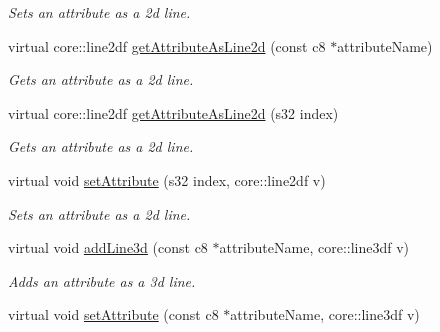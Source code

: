 \begin{DoxyCompactItemize}
\begin{DoxyCompactList}\small\item\em Sets an attribute as a 2d line. \end{DoxyCompactList}\item 
virtual core\-::line2df \hyperlink{classirr_1_1io_1_1_c_attributes_ab90c1609a00e40d975308bd70fa08ac2}{get\-Attribute\-As\-Line2d} (const c8 $\ast$attribute\-Name)
\begin{DoxyCompactList}\small\item\em Gets an attribute as a 2d line. \end{DoxyCompactList}\item 
virtual core\-::line2df \hyperlink{classirr_1_1io_1_1_c_attributes_ae61120841da64d9259d579d3a8e7c875}{get\-Attribute\-As\-Line2d} (s32 index)
\begin{DoxyCompactList}\small\item\em Gets an attribute as a 2d line. \end{DoxyCompactList}\item 
\hypertarget{classirr_1_1io_1_1_c_attributes_ae9b5da78e52324a6e0a2d08457e99c10}{virtual void \hyperlink{classirr_1_1io_1_1_c_attributes_ae9b5da78e52324a6e0a2d08457e99c10}{set\-Attribute} (s32 index, core\-::line2df v)}\label{classirr_1_1io_1_1_c_attributes_ae9b5da78e52324a6e0a2d08457e99c10}

\begin{DoxyCompactList}\small\item\em Sets an attribute as a 2d line. \end{DoxyCompactList}\item 
\hypertarget{classirr_1_1io_1_1_c_attributes_ab0bf89f535354dcecbb580b95da7be6d}{virtual void \hyperlink{classirr_1_1io_1_1_c_attributes_ab0bf89f535354dcecbb580b95da7be6d}{add\-Line3d} (const c8 $\ast$attribute\-Name, core\-::line3df v)}\label{classirr_1_1io_1_1_c_attributes_ab0bf89f535354dcecbb580b95da7be6d}

\begin{DoxyCompactList}\small\item\em Adds an attribute as a 3d line. \end{DoxyCompactList}\item 
\hypertarget{classirr_1_1io_1_1_c_attributes_acae90a82ebea1bace1b99820d21988d7}{virtual void \hyperlink{classirr_1_1io_1_1_c_attributes_acae90a82ebea1bace1b99820d21988d7}{set\-Attribute} (const c8 $\ast$attribute\-Name, core\-::line3df v)}\label{classirr_1_1io_1_1_c_attributes_acae90a82ebea1bace1b99820d21988d7}


\end{DoxyCompactItemize}
